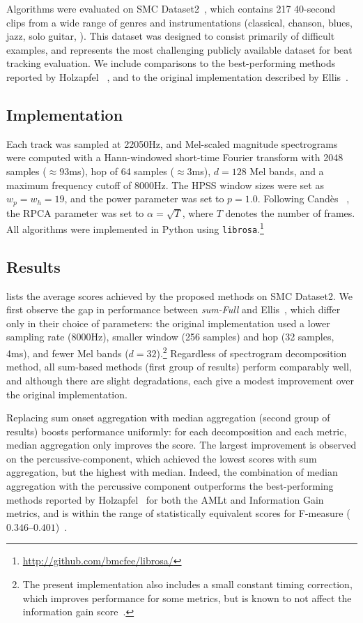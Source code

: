 \documentclass{article}
\begin{document}
Algorithms were evaluated on SMC Dataset2~\cite{holzapfel2012}, which contains 217
40-second clips from a wide range of genres and instrumentations (classical, chanson, 
blues, jazz, solo guitar, \etc).  This dataset was designed to consist primarily of 
difficult examples, and represents the most challenging publicly available dataset for beat
tracking evaluation.  We include comparisons to the best-performing methods reported by
Holzapfel \etal~\cite{holzapfel2012}, and to the original implementation described by
Ellis~\cite{ellis2007beat}.

\subsection{Implementation}
Each track was sampled at 22050Hz, and Mel-scaled magnitude spectrograms were computed 
with a Hann-windowed short-time Fourier transform with 2048 samples ($\approx93$ms), hop 
of 64 samples ($\approx3$ms), $d=128$ Mel bands, and a maximum frequency cutoff of 8000Hz.
The HPSS window sizes were set as $w_p = w_h = 19$, and the power parameter was set 
to $p=1.0$.
Following Cand\`{e}s \etal~\cite{candes2011robust}, the RPCA parameter was set to
${\alpha = \sqrt{T}}$, where $T$ denotes the number of frames.
All algorithms were implemented in Python using \texttt{librosa}.\footnote{\url{http://github.com/bmcfee/librosa/}}

\subsection{Results}

 lists the average scores achieved by the proposed methods on
SMC Dataset2. 
We first observe the gap in performance between \emph{sum-Full} and 
Ellis~\cite{ellis2007beat}, which differ only in their choice of parameters: the 
original implementation used a lower sampling rate (8000Hz), smaller window (256 samples) 
and hop (32 samples, 4ms), and fewer Mel bands ($d=32$).\footnote{The present
implementation also includes a small constant timing correction, which improves 
performance for some metrics, but is known to not affect the information gain
score~\cite{davies2009evaluation}.}
Regardless of spectrogram decomposition method, all sum-based methods (first group of 
results) perform comparably well, and although there are slight degradations, each give 
a modest improvement over the original implementation.

Replacing sum onset aggregation with median aggregation (second group of results)
boosts performance uniformly: for each decomposition and each metric, median
aggregation only improves the score.  The largest improvement is observed on the
percussive-component, which achieved the lowest scores with sum aggregation, but the
highest with median. Indeed, the combination of median aggregation with the percussive
component outperforms the best-performing methods reported by Holzapfel~\etal{} for both 
the AMLt and Information Gain metrics, and is within the range of statistically 
equivalent scores for F-measure ($0.346$--$0.401$)~\cite{holzapfel2012}.
\end{document}
